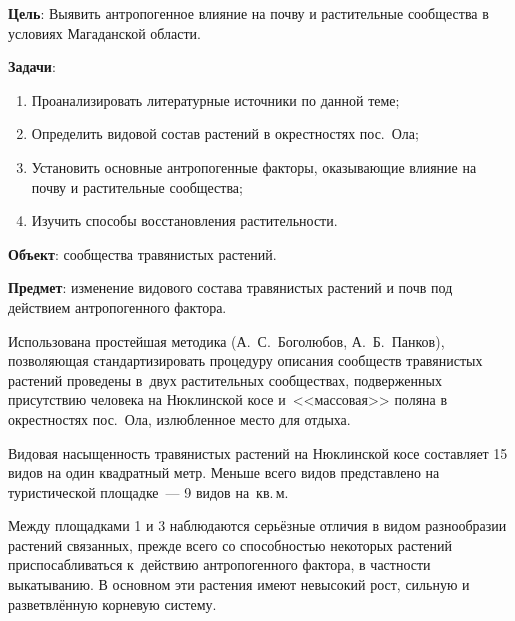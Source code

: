 \bigskip
{}



\makeProcTitleSchool


\textbf{Цель}: Выявить антропогенное влияние на почву и растительные сообщества в условиях Магаданской области.

\textbf{Задачи}:
\begin{enumerate}[noitemsep]\vspace{-8pt}
\item Проанализировать литературные источники по данной теме;
\item Определить видовой состав растений в окрестностях пос.~Ола;
\item Установить основные антропогенные факторы, оказывающие влияние на почву и растительные сообщества;
\item Изучить способы восстановления растительности.
\end{enumerate}\vspace{-8pt}

\textbf{Объект}: сообщества травянистых растений.

\textbf{Предмет}: изменение видового состава травянистых растений и почв под действием антропогенного фактора.

Использована простейшая методика (А.~С.~Боголюбов, А.~Б.~Панков), позволяющая стандартизировать процедуру описания сообществ травянистых растений проведены в~двух растительных сообществах, подверженных присутствию человека на Нюклинской косе и~<<массовая>> поляна в окрестностях пос.~Ола, излюбленное место для отдыха.

Видовая насыщенность травянистых растений на Нюклинской косе составляет 15 видов на один квадратный метр. Меньше всего видов представлено на туристической площадке~--- 9 видов на~кв.\,м.

Между площадками 1 и 3 наблюдаются серьёзные отличия в видом разнообразии растений связанных, прежде всего со способностью некоторых растений приспосабливаться к~действию антропогенного фактора, в частности выкатыванию. В основном эти растения имеют невысокий рост, сильную и разветвлённую корневую систему.

